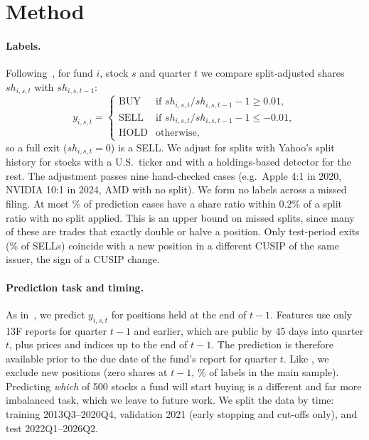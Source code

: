 \section{Method}
\label{sec:method}

\paragraph{Labels.} Following~\cite{cohen2026mimicking}, for fund $i$, stock $s$
and quarter $t$ we compare split-adjusted shares $sh_{i,s,t}$ with
$sh_{i,s,t-1}$:
\[
y_{i,s,t} =
\begin{cases}
\text{BUY} & \text{if } sh_{i,s,t} / sh_{i,s,t-1} - 1 \ge 0.01,\\
\text{SELL} & \text{if } sh_{i,s,t} / sh_{i,s,t-1} - 1 \le -0.01,\\
\text{HOLD} & \text{otherwise,}
\end{cases}
\]
so a full exit ($sh_{i,s,t}=0$) is a SELL. We adjust for splits with Yahoo's
split history for stocks with a U.S.\ ticker and with a holdings-based
detector for the rest. The adjustment passes nine hand-checked cases (e.g.\
Apple 4:1 in 2020, NVIDIA 10:1 in 2024, AMD with no split). We form no labels
across a missed filing. At most \splitlikepct\% of prediction cases have a
share ratio within 0.2\% of a split ratio with no split applied. This is an
upper bound on missed splits, since many of these are trades that exactly
double or halve a position. Only \cusipchangen{} test-period exits
(\cusipchangepct\% of SELLs) coincide with a new position in a different CUSIP
of the same issuer, the sign of a CUSIP change.

\paragraph{Prediction task and timing.} As in~\cite{cohen2026mimicking}, we
predict $y_{i,s,t}$ for positions held at the end of $t-1$. Features use only
13F reports for quarter $t-1$ and earlier, which are public by 45 days into
quarter $t$, plus prices and indices up to the end of $t-1$. The prediction is
therefore available prior to the due date of the fund's report for quarter $t$. Like
\cite{cohen2026mimicking}, we exclude new positions (zero shares at $t-1$,
\newM\% of labels in the main sample). Predicting \emph{which} of 500 stocks a
fund will start buying is a different and far more imbalanced task, which we
leave to future work. We split the data by time: training 2013Q3--2020Q4,
validation 2021 (early stopping and cut-offs only), and test 2022Q1--2026Q2.

